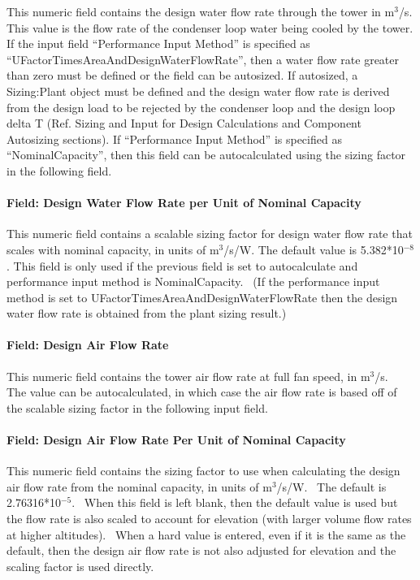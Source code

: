 This numeric field contains the design water flow rate through the tower in m\(^{3}\)/s. This value is the flow rate of the condenser loop water being cooled by the tower. If the input field ``Performance Input Method'' is specified as ``UFactorTimesAreaAndDesignWaterFlowRate'', then a water flow rate greater than zero must be defined or the field can be autosized. If autosized, a Sizing:Plant object must be defined and the design water flow rate is derived from the design load to be rejected by the condenser loop and the design loop delta T (Ref. Sizing and Input for Design Calculations and Component Autosizing sections). If ``Performance Input Method'' is specified as ``NominalCapacity'', then this field can be autocalculated using the sizing factor in the following field.

\paragraph{Field: Design Water Flow Rate per Unit of Nominal Capacity}\label{field-design-water-flow-rate-per-unit-of-nominal-capacity}

This numeric field contains a scalable sizing factor for design water flow rate that scales with nominal capacity, in units of m\(^{3}\)/s/W. The default value is 5.382*10\(^{-8}\). This field is only used if the previous field is set to autocalculate and performance input method is NominalCapacity.~ (If the performance input method is set to UFactorTimesAreaAndDesignWaterFlowRate then the design water flow rate is obtained from the plant sizing result.)

\paragraph{Field: Design Air Flow Rate}\label{field-design-air-flow-rate-1}

This numeric field contains the tower air flow rate at full fan speed, in m\(^{3}\)/s.~ The value can be autocalculated, in which case the air flow rate is based off of the scalable sizing factor in the following input field.

\paragraph{Field: Design Air Flow Rate Per Unit of Nominal Capacity}\label{field-design-air-flow-rate-per-unit-of-nominal-capacity}

This numeric field contains the sizing factor to use when calculating the design air flow rate from the nominal capacity, in units of m\(^{3}\)/s/W.~ The default is 2.76316*10\(^{-5}\).~ When this field is left blank, then the default value is used but the flow rate is also scaled to account for elevation (with larger volume flow rates at higher altitudes).~ When a hard value is entered, even if it is the same as the default, then the design air flow rate is not also adjusted for elevation and the scaling factor is used directly.

